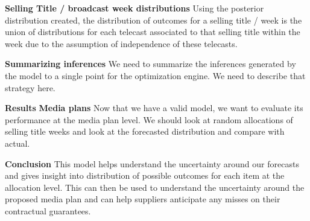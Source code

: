 \documentclass{article}
\begin{document}
\begin{outline}[enumerate]
       \2 \textbf{Selling Title / broadcast week distributions}
           Using the posterior distribution created, the distribution of outcomes for a selling title / week is the union of distributions for each telecast associated to that selling title within the week
           due to the assumption of independence of these telecasts.

       \2 \textbf{Summarizing inferences}
           We need to summarize the inferences generated by the model to a single point for the optimization engine. We need to describe that strategy here.

   \1 \textbf{Results}
      \2 \textbf{Media plans}
      Now that we have a valid model, we want to evaluate its performance at the media plan level.
      We should look at random allocations of selling title weeks and look at the forecasted distribution and compare
      with actual.

   \1 \textbf{Conclusion}
   This model helps understand the uncertainty around our forecasts and gives insight into distribution of possible outcomes for each item at the allocation level. This can then be used to understand the uncertainty
   around the proposed media plan and can help suppliers anticipate any misses on their contractual guarantees.


\end{outline}
\end{document}
